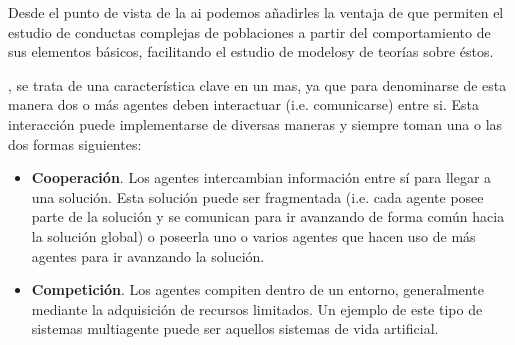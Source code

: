 Desde el punto de vista de la \gls{ai} podemos añadirles la ventaja de que permiten el estudio de conductas complejas de poblaciones a partir del comportamiento de sus elementos básicos, facilitando el estudio de modelosy de teorías sobre éstos.

, se trata de una característica clave en un \gls{mas}, ya que para denominarse de esta manera dos o más agentes deben interactuar (i.e. comunicarse) entre si. Esta interacción puede implementarse de diversas maneras y siempre toman una o las dos formas siguientes:

\begin{itemize}
	\item \textbf{Cooperación}. Los agentes intercambian información entre sí para llegar a una solución. Esta solución puede ser fragmentada (i.e. cada agente posee parte de la solución y se comunican para ir avanzando de forma común hacia la solución global) o poseerla uno o varios agentes que hacen uso de más agentes para ir avanzando la solución.
	\item \textbf{Competición}. Los agentes compiten dentro de un entorno, generalmente mediante la adquisición de recursos limitados. Un ejemplo de este tipo de sistemas multiagente puede ser aquellos sistemas de vida artificial.
\end{itemize}

